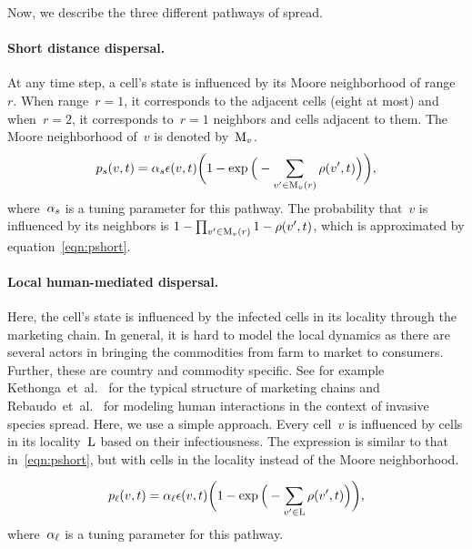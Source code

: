 \documentclass[11pt]{article}
\newcommand{\infest}{\rho}
\newcommand{\suitable}{\epsilon}
\theoremstyle{definition}
\begin{document}
Now, we describe the three different pathways of spread.
\paragraph{Short distance dispersal.}
At any time step, a cell's state is influenced by its Moore
neighborhood of range~$r$. When range~$r=1$, it corresponds to the
adjacent cells (eight at most) and when~$r=2$, it corresponds to~$r=1$
neighbors and cells adjacent to them. The Moore neighborhood of~$v$ is
denoted by~$\mathrm{M}_v$.
\begin{align}\label{eqn:pshort}
    \pshort(v,t)=\asd\suitable(v,t)\bigg(1-
    \exp\Big(-\sum_{v'\in\moore_v(r)}\infest(v',t)\Big)\bigg),
\end{align}
where~$\alpha_s$ is a tuning parameter for this pathway. The probability
that~$v$ is influenced by its neighbors is
$1-\prod_{v'\in\moore_v(r)}1-\infest(v',t)$, which is approximated
by equation~\eqref{eqn:pshort}.
\paragraph{Local human-mediated dispersal.}
Here, the cell's state is influenced by the infected cells in its locality
through the marketing chain.  In general, it is hard to model the local
dynamics as there are several actors in bringing the commodities from farm
to market to consumers.  Further, these are country and commodity specific.
See for example Kethonga~et~al.~\cite{kethonga2004} for the typical
structure of marketing chains and Rebaudo~et~al.~\cite{rebaudo2011} for
modeling human interactions in the context of invasive species spread.
Here, we use a simple approach. Every cell~$v$ is influenced by cells in
its locality~$\mathrm{L}$ based on their infectiousness. 
The expression is similar to that in~\eqref{eqn:pshort}, but with cells in
the locality instead of the Moore neighborhood.

\begin{align}\label{eqn:plocal}
    \plocal(v,t)=\afm\suitable(v,t)\bigg(1-
    \exp\Big(-\sum_{v'\in\locality}\infest(v',t)\Big)\bigg),
\end{align}
where~$\alpha_{\ell}$ is a tuning parameter for this pathway.
\end{document}
